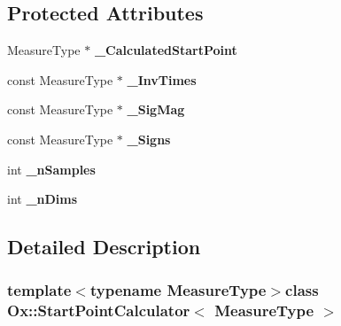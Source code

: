 \subsection*{Protected Attributes}
\begin{DoxyCompactItemize}
\item 
\hypertarget{class_ox_1_1_start_point_calculator_a90c26143db22a371533de08a87cdada0}{Measure\-Type $\ast$ {\bfseries \-\_\-\-Calculated\-Start\-Point}}\label{class_ox_1_1_start_point_calculator_a90c26143db22a371533de08a87cdada0}

\item 
\hypertarget{class_ox_1_1_start_point_calculator_a64929ca24726ddf99017b6f18cc03e29}{const Measure\-Type $\ast$ {\bfseries \-\_\-\-Inv\-Times}}\label{class_ox_1_1_start_point_calculator_a64929ca24726ddf99017b6f18cc03e29}

\item 
\hypertarget{class_ox_1_1_start_point_calculator_a5cf615178da5bb3af984eea616548e05}{const Measure\-Type $\ast$ {\bfseries \-\_\-\-Sig\-Mag}}\label{class_ox_1_1_start_point_calculator_a5cf615178da5bb3af984eea616548e05}

\item 
\hypertarget{class_ox_1_1_start_point_calculator_abce7ef554368d8739ac27dddb63382df}{const Measure\-Type $\ast$ {\bfseries \-\_\-\-Signs}}\label{class_ox_1_1_start_point_calculator_abce7ef554368d8739ac27dddb63382df}

\item 
\hypertarget{class_ox_1_1_start_point_calculator_a17601c059cd679301597bc897e297c2f}{int {\bfseries \-\_\-n\-Samples}}\label{class_ox_1_1_start_point_calculator_a17601c059cd679301597bc897e297c2f}

\item 
\hypertarget{class_ox_1_1_start_point_calculator_a1bee9378aff7741838dad45ff6d5dc1d}{int {\bfseries \-\_\-n\-Dims}}\label{class_ox_1_1_start_point_calculator_a1bee9378aff7741838dad45ff6d5dc1d}

\end{DoxyCompactItemize}


\subsection{Detailed Description}
\subsubsection*{template$<$typename Measure\-Type$>$class Ox\-::\-Start\-Point\-Calculator$<$ Measure\-Type $>$}


